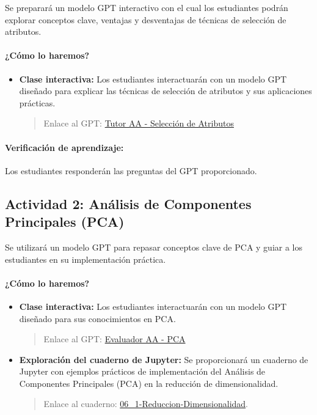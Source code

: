 \documentclass[a4,11pt]{aleph-notas}
\begin{document}
Se preparará un modelo GPT interactivo con el cual los estudiantes podrán explorar conceptos clave, ventajas y desventajas de técnicas de selección de atributos.

\paragraph{¿Cómo lo haremos?}  
\begin{itemize}[leftmargin=*]
    \item \textbf{Clase interactiva:}  
    Los estudiantes interactuarán con un modelo GPT diseñado para explicar las técnicas de selección de atributos y sus aplicaciones prácticas.
    \begin{quote}
        Enlace al GPT: \href{https://chatgpt.com/g/g-674f787b286c8191aee6a93bde4ede57-tutor-aa-seleccion-de-atributos}{Tutor AA - Selección de Atributos}
    \end{quote}
\end{itemize}

\paragraph{Verificación de aprendizaje:}  
Los estudiantes responderán las preguntas del GPT proporcionado.

\subsection*{Actividad 2: Análisis de Componentes Principales (PCA)}

Se utilizará un modelo GPT para repasar conceptos clave de PCA y guiar a los estudiantes en su implementación práctica.

\paragraph{¿Cómo lo haremos?}  
\begin{itemize}[leftmargin=*]
    \item \textbf{Clase interactiva:}  Los estudiantes interactuarán con un modelo GPT diseñado para sus conocimientos en PCA.
    \begin{quote}
        Enlace al GPT: \href{https://chatgpt.com/g/g-674f7cde85ac81918e2a05a692ae0ee9-evluador-aa-pca}{Evaluador AA - PCA}
    \end{quote}

    \item \textbf{Exploración del cuaderno de Jupyter:}  
       Se proporcionará un cuaderno de Jupyter con ejemplos prácticos de implementación del Análisis de Componentes Principales (PCA) en la reducción de dimensionalidad.
    \begin{quote}
        Enlace al cuaderno: \href{https://colab.research.google.com/github/andres-merino/AprendizajeAutomaticoInicial-05-N0105/blob/main/2-Notebooks/06_1-Reduccion-Dimensionalidad.ipynb}{06\_1-Reduccion-Dimensionalidad}.
    \end{quote}
     
\end{itemize}
\end{document}
